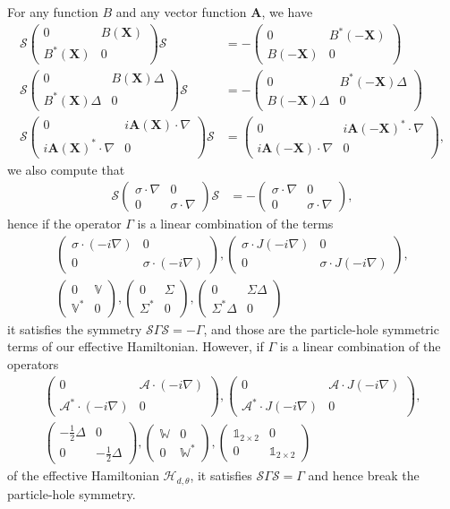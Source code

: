 \documentclass[11pt,a4paper,reqno,french,tikz]{amsart}
\newcommand\cA{\mathcal{A}}\newcommand\cB{\mathcal{B}}\newcommand\cC{\mathcal{C}}\newcommand\cD{\mathcal{D}}\newcommand\cE{\mathcal{E}}\newcommand\cF{\mathcal{F}}\newcommand\cG{\mathcal{G}}\newcommand\cH{\mathcal{H}}\newcommand\cI{\mathcal{I}}\newcommand\cJ{\mathcal{J}}\newcommand\cK{\mathcal{K}}\newcommand\cL{\mathcal{L}}\newcommand\cM{\mathcal{M}}\newcommand\cN{\mathcal{N}}\newcommand\cO{\mathcal{O}}\newcommand\cP{\mathcal{P}}\newcommand\cQ{\mathcal{Q}}\newcommand\cR{\mathcal{R}}\newcommand\cS{\mathcal{S}}\newcommand\cT{\mathcal{T}}\newcommand\cU{\mathcal{U}}\newcommand\cV{\mathcal{V}}\newcommand\cW{\mathcal{W}}\newcommand\cX{\mathcal{X}}\newcommand\cY{\mathcal{Y}}\newcommand\cZ{\mathcal{Z}}
\newcommand{\pa}[1]{\left( #1 \right)} %
\newcommand{\na}{\nabla} %
\newcommand{\f}[2]{\frac{#1}{#2}} %
\newcommand{\mat}[1]{\begin{pmatrix} #1 \end{pmatrix}} %
\def\1{{\mathds{1}}}
\newcommand{\bbV}{\mathbb{V}}
\def\bX{{\mathbf X}}
\def\bbV{{\mathbb V}}
\def\bbW{{\mathbb W}}
\def\1{{\mathds{1}}}
\begin{document}
For any function $B$ and any vector function $\bm{A}$, we have
\begin{align*}
	\cS \mat{0 & B(\bX) \\ B^*(\bX) & 0} \cS &= -\mat{0 & B^*(-\bX) \\ B(-\bX) & 0} \\
	\cS \mat{0 & B(\bX) \Delta \\ B^*(\bX)\Delta & 0} \cS &= -\mat{0 & B^*(-\bX)\Delta \\ B(-\bX)\Delta & 0} \\
	\cS\mat{0 & i\bm{A}(\bX) \cdot \na \\ i\bm{A}(\bX)^* \cdot \na & 0} \cS &= \mat{0 & i \bm{A}(-\bX)^* \cdot \na \\ i\bm{A}(-\bX) \cdot \na & 0},
\end{align*}
we also compute that
\begin{align*}
	\cS \mat{\sigma \cdot \na & 0 \\ 0 & \sigma \cdot \na} \cS &= - \mat{\sigma \cdot \na & 0 \\ 0 & \sigma \cdot \na},
\end{align*}
hence if the operator $\Gamma$ is a linear combination of the terms
\begin{multline*}
\mat{\sigma \cdot \pa{-i\na} & 0 \\ 0 & \sigma \cdot \pa{-i\na}}, \mat{\sigma \cdot J\pa{-i\na} & 0 \\ 0 & \sigma \cdot J\pa{-i\na}}, \\
\mat{0 & \bbV \\ \bbV^* & 0}, \mat{0 & \Sigma \\ \Sigma^* & 0}, \mat{0 & \Sigma \Delta	 \\ \Sigma^* \Delta & 0}
\end{multline*}
it satisfies the symmetry $\cS \Gamma \cS = - \Gamma$, and those are the particle-hole symmetric terms of our effective Hamiltonian. However, if $\Gamma$ is a linear combination of the operators
\begin{align*}
	\mat{0 & \bm{\cA}\cdot\pa{-i\na} \\ \bm{\cA}^* \cdot \pa{-i\na} & 0}, \mat{0 & \bm{\cA}\cdot J\pa{-i\na} \\ \bm{\cA}^* \cdot J\pa{-i\na} & 0},  \\
	\mat{ -\f 12 \Delta & 0 \\ 0 & -\f 12 \Delta}, \mat{\bbW & 0 \\ 0 & \bbW^*}, \mat{\1_{2\times 2} & 0 \\ 0 & \1_{2\times 2}}
\end{align*}
of the effective Hamiltonian $\cH_{d,\theta}$, it satisfies $\cS \Gamma \cS = \Gamma$ and hence break the particle-hole symmetry.
\end{document}
